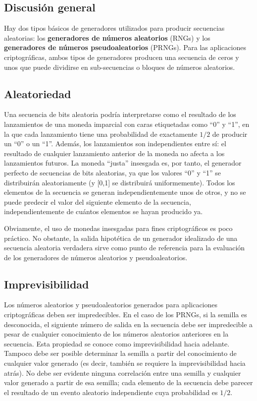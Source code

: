 	\subsection{Discusión general}
	Hay dos tipos básicos de generadores utilizados para producir secuencias aleatorias: los \textbf{generadores de números aleatorios} (RNGs) y los \textbf{generadores de números pseudoaleatorios} (PRNGs). Para las aplicaciones criptográficas, ambos tipos de generadores producen una secuencia de ceros y unos que puede dividirse en sub-secuencias o bloques de números aleatorios. 
	
	\subsection{Aleatoriedad}
	
	Una secuencia de bits aleatoria podría interpretarse como el resultado de los lanzamientos de una moneda imparcial con caras etiquetadas como ``0'' y ``1'', en la que cada lanzamiento tiene una probabilidad de exactamente $1/2$ de producir un ``0'' o un ``1''. Además, los lanzamientos son independientes entre sí: el resultado de cualquier lanzamiento anterior de la moneda no afecta a los lanzamientos futuros. La moneda ``justa'' insesgada es, por tanto, el generador perfecto de secuencias de bits aleatorias, ya que los valores ``0'' y ``1'' se distribuirán aleatoriamente (y [0,1] se distribuirá uniformemente). Todos los elementos de la secuencia se generan independientemente unos de otros, y no se puede predecir el valor del siguiente elemento de la secuencia, independientemente de cuántos elementos se hayan producido ya.
	
	Obviamente, el uso de monedas insesgadas para fines criptográficos es poco práctico. No obstante, la salida hipotética de un generador idealizado de una secuencia aleatoria verdadera sirve como punto de referencia para la evaluación de los generadores de números aleatorios y pseudoaleatorios.
	
	\subsection{Imprevisibilidad}
	
	Los números aleatorios y pseudoaleatorios generados para aplicaciones criptográficas deben ser impredecibles. En el caso de los PRNGs, si la semilla es desconocida, el siguiente número de salida en la secuencia debe ser impredecible a pesar de cualquier conocimiento de los números aleatorios anteriores en la secuencia. Esta propiedad se conoce como imprevisibilidad hacia adelante. Tampoco debe ser posible determinar la semilla a partir del conocimiento de cualquier valor generado (es decir, también se requiere la imprevisibilidad hacia atrás). No debe ser evidente ninguna correlación entre una semilla y cualquier valor generado a partir de esa semilla; cada elemento de la secuencia debe parecer el resultado de un evento aleatorio independiente cuya probabilidad es $1/2$.
	

